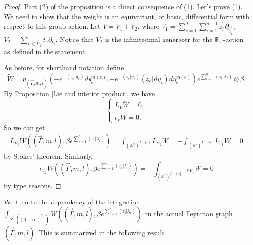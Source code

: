 \documentclass[11pt]{amsart}
\theoremstyle{definition}
\theoremstyle{remark}
\numberwithin{equation}{section}
\begin{document}
\begin{proof}
  Part (2) of the proposition is a direct consequence of (1). Let's prove (1).
We need to show that the weight is an equivariant, or basic, differential form with respect to this group action.
    Let $ V= V_{1}+ V_{2}$, where $ V_{1}=\sum\limits_{s=1}^{d}\sum\limits_{i=1}^{n-1}\bar{\tilde{z}}_{i}^{s}
    \partial_{\bar{\tilde{z}}_{i}^{s}}$, $ V_{2}=\sum\limits_{e\in\vec{\Gamma}_{1}}t_{e}\partial_{t_{e}}$.
    Notice that $V_2$ is the infinitesimal generaotr for the $\mathbb{R}_+$-action as defined in the statement.

    As before, for
    shorthand notation define
    $$
    \tilde{W}=p_{(\vec{\Gamma},m,l)}(-e^{-(z_{e}| y_{e})}dy_{e}^{m(e)},-e^{-(z_{e}| y_{e})}(z_{e}|dy_{e})dy_{e}^{m(e)})e^{\sum\limits_{i=1}^{n}(z_{i}|\lambda_{i})}\otimes \beta.
    $$
    By Proposition \ref{Lie and interior product}, we have
    $$
    \begin{cases}
        L_{ V}\tilde{W}=0,\\
        \iota_{ V}\tilde{W}=0.
    \end{cases}
    $$
    So we can get
    \begin{align*}
        L_{ V_{2}}W((\vec{\Gamma},m,l),\beta e^{\sum\limits_{i=1}^{n}(z_{i}|\lambda_{i})})=\int_{(\mathbb{A}^{d})^{ I-\{n\}}}L_{ V_{2}}\tilde{W}=-\int_{(\mathbb{A}^{d})^{ I-\{n\}}}L_{ V_{1}}\tilde{W}=0
    \end{align*}
    by Stokes' theorem.
    Similarly,
    $$
    \iota_{ V_{2}}W((\vec{\Gamma},m,l),\beta e^{\sum\limits_{i=1}^{n}(z_{i}|\lambda_{i})})=\pm\int_{(\mathbb{A}^{d})^{ I-\{n\}}}\iota_{ V_{1}}\tilde{W}=0
    $$
    by type reasons.
\end{proof}
We turn to the dependency of the integration $\int_{S^{+}((0,+\infty)^{\vec{\Gamma}_{1}})}W((\vec{\Gamma},m,l),\beta
e^{\sum\limits_{i=1}^{n}(z_{i}|\lambda_{i})})$ on the actual Feynman graph $(\vec{\Gamma},m,l)$.
This is summarized in the following result.
\end{document}
